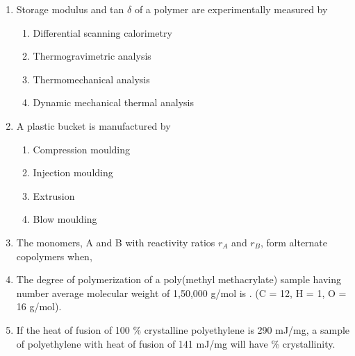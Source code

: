 \documentclass[a4paper,10pt]{article}
\begin{document}
\begin{enumerate}
    \item Storage modulus and tan $\delta$ of a polymer are experimentally measured by
    \hfill{}
    \begin{enumerate}[label=\Alph*)]
        \item Differential scanning calorimetry
        \item Thermogravimetric analysis
        \item Thermomechanical analysis
        \item Dynamic mechanical thermal analysis
    \end{enumerate}

    \item A plastic bucket is manufactured by
    \hfill{}
    \begin{enumerate}[label=\Alph*)]
        \item Compression moulding
        \item Injection moulding
        \item Extrusion
        \item Blow moulding
    \end{enumerate}

    \item The monomers, A and B with reactivity ratios $r_A$ and $r_B$, form alternate copolymers when,
    \hfill{}
    \begin{enumerate}[label=\Alph*)]
    \end{enumerate}

    \item The degree of polymerization of a poly(methyl methacrylate) sample having number average molecular weight of 1,50,000 g/mol is \underline{\hspace{2cm}}.
    (C = 12, H = 1, O = 16 g/mol).
    \hfill{}

    \item If the heat of fusion of 100 \% crystalline polyethylene is 290 mJ/mg, a sample of polyethylene with heat of fusion of 141 mJ/mg will have \underline{\hspace{2cm}} \% crystallinity.
    \hfill{}


\end{enumerate}
\end{document}
